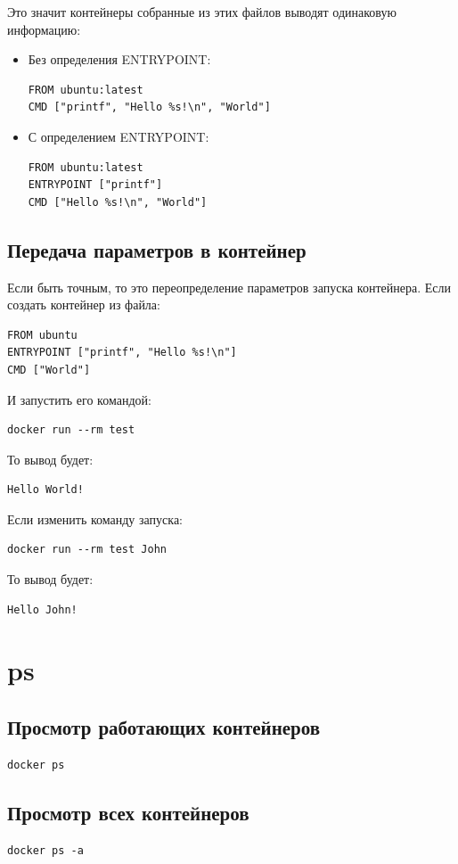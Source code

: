 Это значит контейнеры собранные из этих файлов выводят одинаковую информацию:


\begin{itemize}
\item Без определения ENTRYPOINT:
\begin{lstlisting}
FROM ubuntu:latest
CMD ["printf", "Hello %s!\n", "World"]
\end{lstlisting}
\item С определением ENTRYPOINT:
\begin{lstlisting}
FROM ubuntu:latest
ENTRYPOINT ["printf"]
CMD ["Hello %s!\n", "World"]
\end{lstlisting}
\end{itemize}

\subsection{Передача параметров в контейнер}
Если быть точным, то это переопределение параметров запуска контейнера.
Если создать контейнер из файла:
\begin{lstlisting}
FROM ubuntu
ENTRYPOINT ["printf", "Hello %s!\n"]
CMD ["World"]
\end{lstlisting}
И запустить его командой:
\begin{lstlisting}
docker run --rm test
\end{lstlisting}
То вывод будет:
\begin{lstlisting}
Hello World!
\end{lstlisting}

Если изменить команду запуска:
\begin{lstlisting}
docker run --rm test John
\end{lstlisting}
То вывод будет:
\begin{lstlisting}
Hello John!
\end{lstlisting}


\section{ps}

\subsection{Просмотр работающих контейнеров}
\begin{lstlisting}
docker ps
\end{lstlisting}

\subsection{Просмотр всех контейнеров}
\begin{lstlisting}
docker ps -a
\end{lstlisting}

